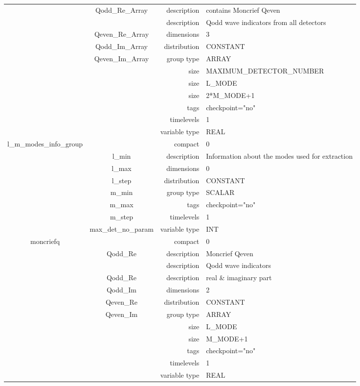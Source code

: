 \documentclass{article}
\begin{document}
\begin{tabular*}{150mm}{|c|c@{\extracolsep{\fill}}|rl|}
 & Qodd\_Re\_Array & description & contains Moncrief Qeven \\ 
& ~ & description &  Qodd wave indicators from all detectors \\ 
 & Qeven\_Re\_Array & dimensions & 3 \\ 
 & Qodd\_Im\_Array & distribution & CONSTANT \\ 
 & Qeven\_Im\_Array & group type & ARRAY \\ 
 &  & size & MAXIMUM\_DETECTOR\_NUMBER \\ 
& ~ & size & L\_MODE \\ 
 &  & size & 2*M\_MODE+1 \\ 
 &  & tags & checkpoint="no" \\ 
 &  & timelevels & 1 \\ 
 &  & variable type & REAL \\ 
\hline 
l\_m\_modes\_info\_group &  & compact & 0 \\ 
 & l\_min & description & Information about the modes used for extraction \\ 
 & l\_max & dimensions & 0 \\ 
 & l\_step & distribution & CONSTANT \\ 
 & m\_min & group type & SCALAR \\ 
 & m\_max & tags & checkpoint="no" \\ 
 & m\_step & timelevels & 1 \\ 
 & max\_det\_no\_param & variable type & INT \\ 
\hline 
moncriefq &  & compact & 0 \\ 
 & Qodd\_Re & description & Moncrief Qeven \\ 
& ~ & description &  Qodd wave indicators \\ 
 & Qodd\_Re & description &  real \& imaginary part \\ 
 & Qodd\_Im & dimensions & 2 \\ 
 & Qeven\_Re & distribution & CONSTANT \\ 
 & Qeven\_Im & group type & ARRAY \\ 
 &  & size & L\_MODE \\ 
& ~ & size & M\_MODE+1 \\ 
 &  & tags & checkpoint="no" \\ 
 &  & timelevels & 1 \\ 
 &  & variable type & REAL \\ 
\hline 
\end{tabular*} 
\end{document}
